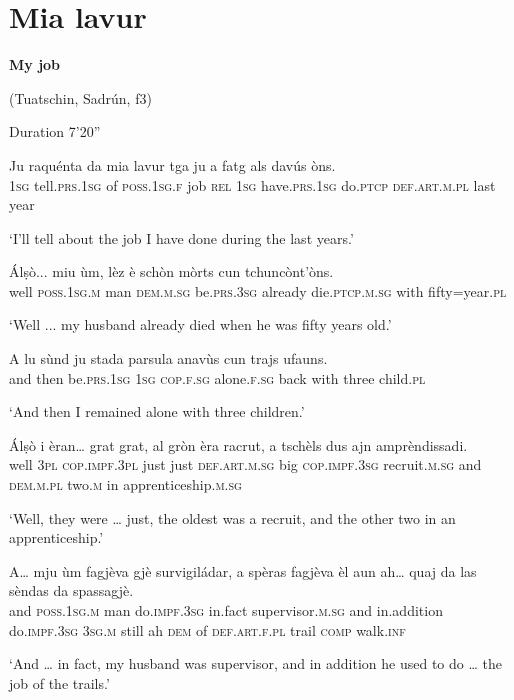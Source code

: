 \section{Mia lavur}
\textbf{My job}


(Tuatschin, Sadrún, f3)


Duration 7'20''
\bigskip

\begin{linenumbers}
\gll   Ju raquénta da mia lavur tga ju a fatg als davús òns. \\
 \textsc{1sg} tell.\textsc{prs.1sg} of \textsc{poss.1sg.f} job \textsc{rel} \textsc{1sg}  have.\textsc{prs.1sg} do.\textsc{ptcp} \textsc{def.art.m.pl} last year\\
\end{linenumbers}
\medskip
\glt `I’ll tell about the job I have done during the last years.'
\medskip

\begin{linenumbers}
\gll  Álṣò... miu ùm, lèz è schòn mòrts cun tchuncònt’òns.  \\
well \textsc{poss.1sg.m} man \textsc{dem.m.sg} be.\textsc{prs.3sg} already die.\textsc{ptcp.m.sg}  with fifty=year.\textsc{pl} \\
\end{linenumbers}
\medskip
\glt `Well ... my husband already died when he was fifty years old.'
\medskip

\begin{linenumbers}
\gll A lu sùnd ju stada parsula anavùs cun trajs ufauns.   \\
and then be.\textsc{prs.1sg} \textsc{1sg} \textsc{cop.f.sg} alone.\textsc{f.sg} back with three  child.\textsc{pl}  \\
\end{linenumbers}
\medskip
\glt `And then I remained alone with three children.'
\medskip

\begin{linenumbers}
\gll   Álṣò i èran… grat grat, al gròn èra racrut, a tschèls dus ajn amprèndissadi. \\
well \textsc{3pl} \textsc{cop.impf.3pl} just just \textsc{def.art.m.sg} big \textsc{cop.impf.3sg} recruit.\textsc{m.sg} and  \textsc{dem.m.pl} two.\textsc{m} in apprenticeship.\textsc{m.sg} \\
\end{linenumbers}
\medskip
\glt `Well, they were … just, the oldest was a recruit, and the other two in an apprenticeship.'
\medskip

\begin{linenumbers}
\gll  A… mju ùm fagjèva gjè survigiládar, a spèras fagjèva èl aun ah… quaj da las sèndas da spassagjè.  \\
and \textsc{poss.1sg.m} man do.\textsc{impf.3sg} in.fact supervisor.\textsc{m.sg} and in.addition do.\textsc{impf.3sg} \textsc{3sg.m} still ah  \textsc{dem} of \textsc{def.art.f.pl} trail \textsc{comp} walk.\textsc{inf} \\
\end{linenumbers}
\medskip
\glt `And … in fact, my husband was supervisor, and in addition he used to do … the job of the trails.'
\medskip

